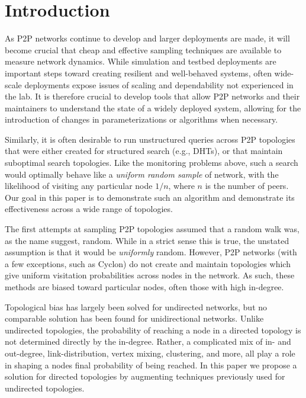 \section{Introduction}

As P2P networks continue to develop and larger deployments are made, it will
become crucial that cheap and effective sampling techniques are available to
measure network dynamics.  While simulation and testbed deployments are
important steps toward creating resilient and well-behaved systems, often
wide-scale deployments expose issues of scaling and dependability not
experienced in the lab.
It is therefore crucial to develop tools that allow P2P networks and their
maintainers to understand the state of a widely deployed system, allowing for
the introduction of changes in parameterizations or algorithms when necessary.

Similarly, it is often desirable to run unstructured queries across P2P
topologies that were either created for structured search (e.g., DHTs), or that
maintain suboptimal search topologies.  Like the monitoring problems above,
such a search would optimally behave like a \emph{uniform random sample} of
network, with the likelihood of visiting any particular node $1/n$, where $n$
is the number of peers.  Our goal in this paper is to demonstrate such an
algorithm and demonstrate its effectiveness across a wide range of topologies.

The first attempts at sampling P2P topologies assumed that a random walk was,
as the name suggest, random.  While in a strict sense this is true, the
unstated assumption is that it would be \emph{uniformly} random.  However, P2P
networks (with a few exceptions, such as Cyclon) do not create and maintain
topologies which give uniform visitation probabilities across nodes in the
network.  As such, these methods are biased toward particular nodes, often
those with high in-degree.

Topological bias has largely been solved for undirected networks, but no
comparable solution has been found for unidirectional networks. Unlike
undirected topologies, the probability of reaching a node in a directed
topology is not determined directly by the in-degree.  Rather, a complicated
mix of in- and out-degree, link-distribution, vertex mixing, clustering,
and more, all play a role in shaping a nodes final probability of being
reached.  In this paper we propose a solution for directed topologies by
augmenting techniques previously used for undirected topologies.

